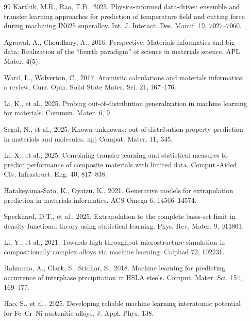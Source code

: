 \documentclass[preprint,12pt,authoryear]{elsarticle}
\begin{document}
\begin{thebibliography}{99}
Karthik, M.R., Rao, T.B., 2025. Physics-informed data-driven ensemble and
transfer learning approaches for prediction of temperature field and
cutting force during machining IN625 superalloy. Int. J. Interact. Des.
Manuf. 19, 7027--7060.

Agrawal, A., Choudhary, A., 2016. Perspective: Materials informatics and
big data: Realization of the ``fourth paradigm'' of science in materials
science. APL Mater. 4(5).

Ward, L., Wolverton, C., 2017. Atomistic calculations and materials
informatics: a review. Curr. Opin. Solid State Mater. Sci. 21, 167--176.

Li, K., et al., 2025. Probing out-of-distribution generalization in machine
learning for materials. Commun. Mater. 6, 9.

Segal, N., et al., 2025. Known unknowns: out-of-distribution property
prediction in materials and molecules. npj Comput. Mater. 11, 345.

Li, X., et al., 2025. Combining transfer learning and statistical measures
to predict performance of composite materials with limited data.
Comput.-Aided Civ. Infrastruct. Eng. 40, 817--838.

Hatakeyama-Sato, K., Oyaizu, K., 2021. Generative models for extrapolation
prediction in materials informatics. ACS Omega 6, 14566--14574.

Speckhard, D.T., et al., 2025. Extrapolation to the complete basis-set
limit in density-functional theory using statistical learning. Phys. Rev.
Mater. 9, 013801.

Li, Y., et al., 2021. Towards high-throughput microstructure simulation in
compositionally complex alloys via machine learning. Calphad 72, 102231.

Rahnama, A., Clark, S., Sridhar, S., 2018. Machine learning for predicting
occurrence of interphase precipitation in HSLA steels. Comput. Mater. Sci.
154, 169--177.

Hao, S., et al., 2025. Developing reliable machine learning interatomic
potential for Fe--Cr--Ni austenitic alloys. J. Appl. Phys. 138.


\end{thebibliography}
\end{document}
